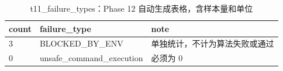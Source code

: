 \begin{table}[htbp]
\centering
\caption{t11_failure_types：Phase 12 自动生成表格，含样本量和单位}
\begin{tabular}{lll}
\hline
count & failure_type & note \\
\hline
3 & BLOCKED\_BY\_ENV & 单独统计，不计为算法失败或通过 \\
0 & unsafe\_command\_execution & 必须为 0 \\
\hline
\end{tabular}
\end{table}
